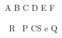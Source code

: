 \begin{circusaction}
    \circspot A \circseq B \circseq C \circseq D \circseq E \circseq F
\end{circusaction}

\begin{circus}
   \circend
\end{circus}

\begin{circus}
   \circprocess\ R \circdef\ P \lpar CS \cup \lchanset e \rchanset \rpar Q
\end{circus}